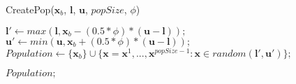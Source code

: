 \begin{breakablealgorithm}
\caption{CreatePop($\bm{x}_b$, $\bm{l}$, $\bm{u}$, $popSize$, $\phi$)}
\label{alg:CreatePop}
\begin{algorithmic}[1]

\State $\bm{l}' \gets max(\bm{l}, \bm{x}_b - (0.5 * \phi) * (\bm{u} - \bm{l}));$
\State $\bm{u}' \gets min(\bm{u}, \bm{x}_b + (0.5 * \phi) * (\bm{u} - \bm{l}));$
\State $Population \gets \{\bm{x}_b\} \cup \{\bm{x} = \bm{x}^1, ..., \bm{x}^{popSize-1} : \bm{x} \in random(\bm{l}', \bm{u}')\};$

\State \Return $Population;$

\end{algorithmic}
\end{breakablealgorithm}